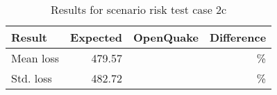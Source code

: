 \begin{table}[htbp]

\centering
\begin{tabular}{ l r r r }

\hline
\rowcolor{anti-flashwhite}
\bf{Result} & \bf{Expected} & \bf{OpenQuake} & \bf{Difference}\\
\hline
Mean loss & 479.57 &  & \% \\
Std. loss & 482.72 &  & \% \\
\hline
\end{tabular}

\caption{Results for scenario risk test case 2c}
\label{tab:result-scenario-risk-2c}
\end{table}